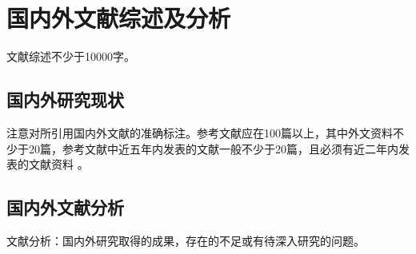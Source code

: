 \section{国内外文献综述及分析}
文献综述不少于10000字。

\subsection{国内外研究现状}
注意对所引用国内外文献的准确标注。参考文献应在100篇以上，其中外文资料不少于20篇，参考文献中近五年内发表的文献一般不少于20篇，且必须有近二年内发表的文献资料 \cite{neepugrad2022_proposal}。


\subsection{国内外文献分析}
文献分析：国内外研究取得的成果，存在的不足或有待深入研究的问题。